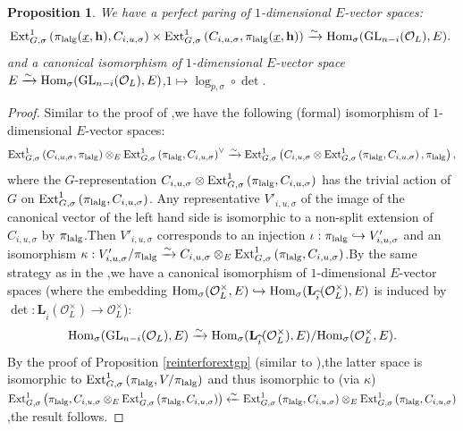 \documentclass[10pt]{article}
\newtheorem{pro}[thm]{Proposition}
\newcommand{\homo}{{\rm Hom}}
\newcommand{\ext}{{\rm Ext}}
\newcommand{\GLN}{{\rm GL}}
\newcommand{\lalg}{{\rm lalg}}
\newcommand{\bL}{{\mathbf{L}}}
\newcommand{\bh}{{\mathbf{h}}}
\newcommand{\cO}{\mathcal O}
\begin{document}
\begin{pro}
	We have a perfect paring of $1$-dimensional $E$-vector spaces:
	\begin{equation}\label{dualpairing}
		\ext^1_{G,\sigma}\left(\pi_{\lalg}(\underline{x},\bh),C_{i,u,\sigma}\right)\times\ext^1_{G,\sigma}\left(C_{i,u,\sigma},\pi_{\lalg}(\underline{x},\bh)\right)\xrightarrow{\sim}\homo_{\sigma}(\GLN_{n-i}(\cO_L),E).\;
	\end{equation}
	and a canonical isomorphism of $1$-dimensional $E$-vector space $E\xrightarrow{\sim }\homo_{\sigma}(\GLN_{n-i}(\cO_L),E)$,\;$1\mapsto \log_{p,\sigma}\circ \det$.\;
\end{pro}
\begin{proof}
	Similar to the proof of \cite[Proposition 2.1.10]{BDcritical25},\;we have the following (formal) isomorphism of $1$-dimensional $E$-vector spaces:
	\[\ext^1_{G,\sigma}\left(C_{i,u,\sigma},\pi_{\lalg}\right)\otimes_E\ext^1_{G,\sigma}\left(\pi_{\lalg},C_{i,u,\sigma}\right)^{\vee}\xrightarrow{\sim}\ext^1_{G,\sigma}\left(C_{i,u,\sigma}\otimes\ext^1_{G,\sigma}\left(\pi_{\lalg},C_{i,u,\sigma}\right),\pi_{\lalg}\right),\]
	where the $G$-representation $C_{i,u,\sigma}\otimes\ext^1_{G,\sigma}\left(\pi_{\lalg},C_{i,u,\sigma}\right)$ has the trivial action of $G$ on $\ext^1_{G,\sigma}\left(\pi_{\lalg},C_{i,u,\sigma}\right)$. Any 
	representative $V'_{i,u,\sigma}$ of the image of the canonical vector of the left hand side is isomorphic to a non-split extension of $C_{i,u,\sigma}$ by $\pi_{\lalg}$.\;Then $V'_{i,u,\sigma}$ corresponds to an injection $\iota:\pi_{\lalg}\hookrightarrow V'_{i,u,\sigma}$ and an isomorphism $\kappa:V'_{i,u,\sigma}/\pi_{\lalg}\xrightarrow{\sim}C_{i,u,\sigma}\otimes_E\ext^1_{G,\sigma}\left(\pi_{\lalg},C_{i,u,\sigma}\right)$.\;By the same strategy as in the \cite[(37)]{BDcritical25},\;we have a canonical isomorphism of $1$-dimensional $E$-vector spaces (where the embedding $\homo_{\sigma}(\cO_L^{\times},E)\hookrightarrow \homo_{\sigma}(\bL_{\widehat{i}}(\cO_L^{\times}),E)$ is induced by $\det:\bL_{\widehat{i}}(\cO_L^{\times})\rightarrow \cO_L^{\times}$):
	\[\homo_{\sigma}(\GLN_{n-i}(\cO_L),E)\xrightarrow{\sim}\homo_{\sigma}(\bL_{\widehat{i}}(\cO_L^{\times}),E)/\homo_{\sigma}(\cO_L^{\times},E).\]
	By the proof of Proposition \ref{reinterforextgp} (similar to \cite[(34)]{BDcritical25}),\;the latter space is isomorphic to $\ext^1_{G,\sigma}\left(\pi_{\lalg},V/\pi_{\lalg}\right)$ and thus isomorphic to (via $\kappa$) $\ext^1_{G,\sigma}\left(\pi_{\lalg},C_{i,u,\sigma}\otimes_E\ext^1_{G,\sigma}\left(\pi_{\lalg},C_{i,u,\sigma}\right)\right)\xleftarrow{\sim} \ext^1_{G,\sigma}\left(\pi_{\lalg},C_{i,u,\sigma}\right)\otimes_E\ext^1_{G,\sigma}\left(\pi_{\lalg},C_{i,u,\sigma}\right)$,\;the result follows.\;
\end{proof}
\end{document}
